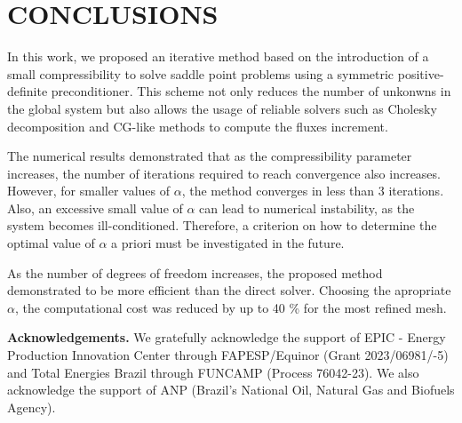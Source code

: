 \documentclass{wccm2024}
\begin{document}
\section{CONCLUSIONS}

In this work, we proposed an iterative method based on the introduction of a small compressibility to solve saddle point problems using a symmetric positive-definite preconditioner. This scheme not only reduces the number of unkonwns in the global system but also allows the usage of reliable solvers such as Cholesky decomposition and CG-like methods to compute the fluxes increment.

The numerical results demonstrated that as the compressibility parameter increases, the number of iterations required to reach convergence also increases. However, for smaller values of $\alpha$, the method converges in less than 3 iterations. Also, an excessive small value of $\alpha$ can lead to numerical instability, as the system becomes ill-conditioned. Therefore, a criterion on how to determine the optimal value of $\alpha$ a priori must be investigated in the future.

As the number of degrees of freedom increases, the proposed method demonstrated to be more efficient than the direct solver. Choosing the apropriate $\alpha$, the computational cost was reduced by up to 40 \% for the most refined mesh.

\vspace{20pt}
\noindent \textbf{Acknowledgements.} We gratefully acknowledge the support of EPIC - Energy Production Innovation Center through FAPESP/Equinor (Grant 2023/06981/-5)  and Total Energies Brazil through FUNCAMP (Process 76042-23). We also acknowledge the support of ANP (Brazil’s National Oil, Natural Gas and Biofuels Agency).
\vspace{12pt}



\end{document}
